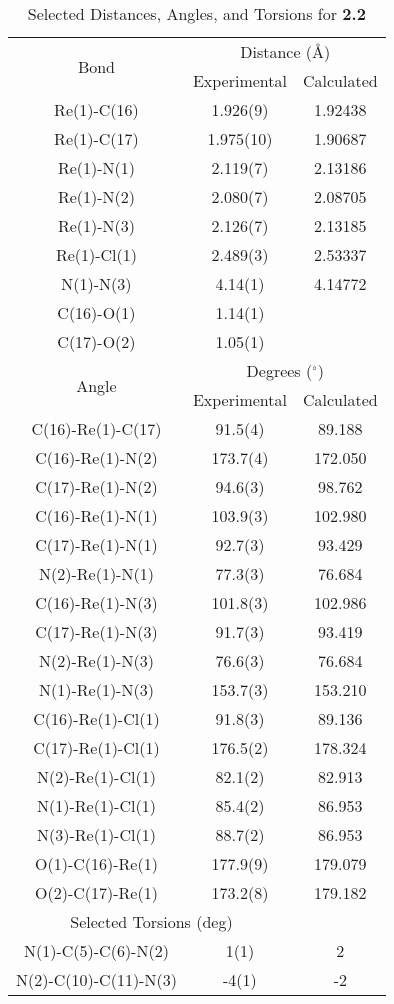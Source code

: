 \begin{table}[htbp]
  \caption{Selected Distances, Angles, and Torsions for \textbf{2.2}}
  \centering
    \begin{tabular}{ccc}
    \toprule
    \multirow{2}{*}{Bond} & \multicolumn{2}{c}{Distance (\r{A})} \\ \cline{2-3}
     & Experimental & Calculated \\ \midrule
    Re(1)-C(16) & 1.926(9) & 1.92438\\
    Re(1)-C(17) & 1.975(10) & 1.90687\\
    Re(1)-N(1) & 2.119(7) & 2.13186\\
    Re(1)-N(2) & 2.080(7) & 2.08705\\
    Re(1)-N(3) & 2.126(7) & 2.13185\\
    Re(1)-Cl(1) & 2.489(3) & 2.53337 \\
    N(1)-N(3) & 4.14(1) & 4.14772 \\ 
    C(16)-O(1) & 1.14(1) & \\
    C(17)-O(2) & 1.05(1) & \\ \midrule
    \multirow{2}{*}{Angle} & \multicolumn{2}{c}{Degrees ($^\circ$)} \\ \cline{2-3}
     & Experimental & Calculated \\ \midrule
    C(16)-Re(1)-C(17) & 91.5(4) & 89.188 \\
    C(16)-Re(1)-N(2) & 173.7(4) & 172.050 \\
    C(17)-Re(1)-N(2) & 94.6(3) & 98.762 \\
    C(16)-Re(1)-N(1) & 103.9(3) & 102.980 \\
    C(17)-Re(1)-N(1) & 92.7(3) & 93.429 \\
    N(2)-Re(1)-N(1) & 77.3(3) & 76.684 \\
    C(16)-Re(1)-N(3) & 101.8(3) & 102.986 \\
    C(17)-Re(1)-N(3) & 91.7(3) & 93.419 \\
    N(2)-Re(1)-N(3) & 76.6(3) & 76.684 \\
    N(1)-Re(1)-N(3) & 153.7(3) & 153.210 \\
    C(16)-Re(1)-Cl(1) & 91.8(3) & 89.136 \\
    C(17)-Re(1)-Cl(1) & 176.5(2) & 178.324 \\
    N(2)-Re(1)-Cl(1) & 82.1(2) & 82.913 \\
    N(1)-Re(1)-Cl(1) & 85.4(2) & 86.953 \\
    N(3)-Re(1)-Cl(1) & 88.7(2) & 86.953 \\
    O(1)-C(16)-Re(1) & 177.9(9) & 179.079 \\
    O(2)-C(17)-Re(1) & 173.2(8) & 179.182 \\ \midrule
    \multicolumn{2}{c}{Selected Torsions (deg)} \\ \midrule
    N(1)-C(5)-C(6)-N(2) & 1(1) & 2 \\
    N(2)-C(10)-C(11)-N(3) & -4(1) & -2 \\
    \bottomrule
    \end{tabular}%
  \label{tab.da2}%
\end{table}%


